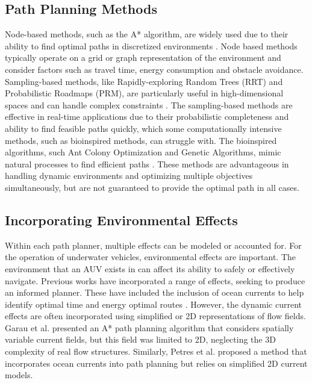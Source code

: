 \documentclass[final,5p,times,twocolumn]{elsarticle}
\begin{document}
\subsection{Path Planning Methods} %

Node-based methods, such as the A* algorithm, are widely used due to their ability to find optimal paths in discretized environments \cite{Garau2005}. Node based methods typically operate on a grid or graph representation of the environment and consider factors such as travel time, energy consumption and obstacle avoidance. Sampling-based methods, like Rapidly-exploring Random Trees (RRT) and Probabilistic Roadmaps (PRM), are particularly useful in high-dimensional spaces and can handle complex constraints \cite{LaValle2006, RandomTrees}. The sampling-based methods are effective in real-time applications due to their probabilistic completeness and ability to find feasible paths quickly, which some computationally intensive methods, such as bioinspired methods, can struggle with. The bioinspired algorithms, such Ant Colony Optimization and Genetic Algorithms, mimic natural processes to find efficient paths \cite{AntColony, Alvarez2004}. These methods are advantageous in handling dynamic environments and optimizing multiple objectives simultaneously, but are not guaranteed to provide the optimal path in all cases. 

\subsection{Incorporating Environmental Effects} %

Within each path planner, multiple effects can be modeled or accounted for. For the operation of underwater vehicles, environmental effects are important. The environment that an AUV exists in can affect its ability to safely or effectively navigate. Previous works have incorporated a range of effects, seeking to produce an informed planner. These have included the inclusion of ocean currents to help identify optimal time and energy optimal routes \cite{Kruger2007, X2, Li2016}. However, the dynamic current effects are often incorporated using simplified or 2D representations of flow fields. Garau et al. \cite{Garau2005} presented an A* path planning algorithm that considers spatially variable current fields, but this field was limited to 2D, neglecting the 3D complexity of real flow structures. Similarly, Petres et al. \cite{Petres2007} proposed a method that incorporates ocean currents into path planning but relies on simplified 2D current models. 
\end{document}
